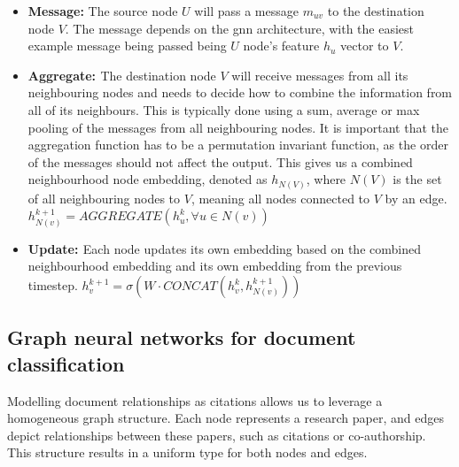 \documentclass[10pt,oneside]{book}
\begin{document}
\begin{tcolorbox}[title=Message Passing Neural Networks in \glspl*{gnn}]
    \begin{itemize}
        \item {\bf{Message:}} The source node $U$ will pass a message $m_{uv}$ to the destination node $V$. The message depends on the \gls*{gnn} architecture, with the easiest example message being passed being $U$ node's feature $h_u$ vector to $V$.
        \item {\bf{Aggregate: }} The destination node $V$ will receive messages from all its neighbouring nodes and needs to decide how to combine the information from all of its neighbours. This is typically done using a sum, average or max pooling of the messages from all neighbouring nodes. It is important that the aggregation function has to be a permutation invariant function, as the order of the messages should not affect the output. This gives us a combined neighbourhood node embedding, denoted as $h_{N(V)}$, where $N(V)$ is the set of all neighbouring nodes to $V$, meaning all nodes connected to $V$ by an edge. $h_{N(v)}^{k+1} = AGGREGATE({h_u^k, \forall u \in N(v)})$
        \item {\bf{Update: }} Each node updates its own embedding based on the combined neighbourhood embedding and its own embedding from the previous timestep. $h_v^{k+1} = \sigma(W \cdot CONCAT(h_v^k, h_{N(v)}^{k+1}))$
    \end{itemize}

\end{tcolorbox}

\subsection{Graph neural networks for document classification}

Modelling document relationships as citations allows us to leverage a homogeneous graph structure. Each node represents a research paper, and edges depict relationships between these papers, such as citations or co-authorship. This structure results in a uniform type for both nodes and edges.
\end{document}
